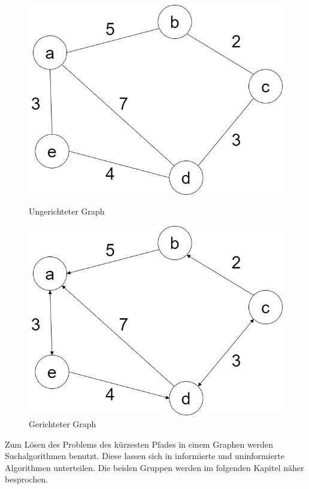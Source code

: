 \begin{figure}[!tbp]
	\centering
	\begin{minipage}[b]{0.4\textwidth}
		\includegraphics[width=\linewidth]{images/undirGraph.png}
		\caption{Ungerichteter Graph}
		\label{fig:undirGraph}
	\end{minipage}
	\hfill
	\begin{minipage}[b]{0.4\textwidth}
		\includegraphics[width=\linewidth]{images/dirGraph.png}
		\caption{Gerichteter Graph}
		\label{fig:dirGraph}
	\end{minipage}
\end{figure}





Zum Lösen des Problems des kürzesten Pfades in einem Graphen werden Suchalgorithmen benutzt. Diese lassen sich in informierte und uninformierte Algorithmen unterteilen. Die beiden Gruppen werden im folgenden Kapitel näher besprochen.
